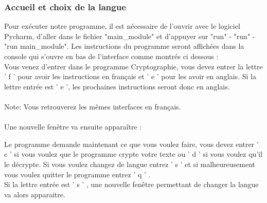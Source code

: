 \documentclass[a4paper,12pt,abstracton,titlepage]{scrartcl}
\begin{document}
\subsubsection{Accueil et choix de la langue}
Pour exécuter notre programme, il est nécessaire de l'ouvrir avec le logiciel Pycharm, d'aller dans le fichier "main\_module" et d'appuyer sur "run" - "run" - "run main\_module".
Les instructions du programme seront affichées dans la console qui s'ouvre en bas de l'interface comme montrés ci dessous :
\vspace{0.5cm}
\\
{
	\label{SP}
}
\vspace{0.5cm}
Vous venez d’entrer dans le programme Cryptographie, vous devez entrer la lettre ' f ' pour avoir les instructions en français et ' e ' pour les avoir en anglais.
Si la lettre entrée est ' e ', les prochaines instructions seront donc en anglais. \\
\\
Note: Vous retrouverez les mêmes interfaces en français.\\
\\
Une nouvelle fenêtre va ensuite apparaître :
\vspace{0.5cm}
\\
{	%
\label{EMM}
}
\vspace{0.5cm}

Le programme demande maintenant ce que vous voulez faire, vous devez entrer ' c ' si vous voulez que le programme crypte votre texte ou ' d ' si vous voulez qu'il le décrypte.
Si vous voulez changez de langue entrez ' s ' et si malheureusement vous voulez quitter le programme entrez ' q ' .\\
\newpage
Si la lettre entrée est ' s ' , une nouvelle fenêtre permettant de changer la langue va alors apparaitre.
\vspace{0.5cm}
\\
{
\label{ESD}
}
\vspace{0.5cm}
\end{document}

